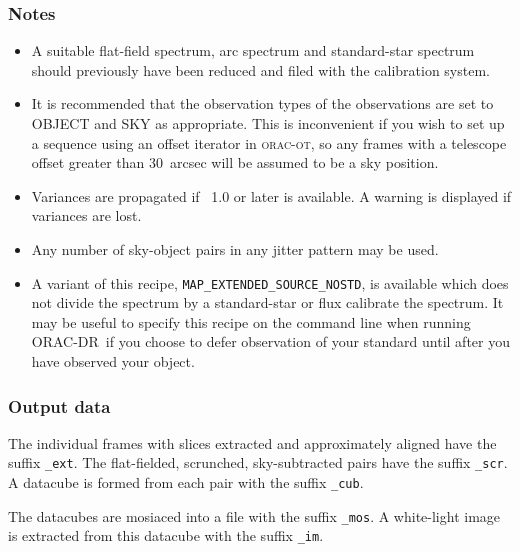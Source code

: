 \documentclass[twoside,11pt,nolof]{starlink}
\providecommand{\KAPPA}{\xref{{\sc{Kappa}}}{sun95}{}}
\providecommand{\ORACDR}{{\footnotesize ORAC-DR}}
\begin{document}
\subsubsection*{Notes}\begin{itemize}
\item

  A suitable flat-field spectrum, arc spectrum and standard-star
  spectrum should previously have been reduced and filed with the
  calibration system.

\item

It is recommended that the observation types of the observations are set
to OBJECT and SKY as appropriate. This is inconvenient if you wish to
set up a sequence using an offset iterator in \textsc{orac-ot}, so any frames
with a telescope offset greater than 30~arcsec will be assumed to be a
sky position.

\item

Variances are propagated if \KAPPA\ 1.0 or later is available. A warning
is displayed if variances are lost.

\item

Any number of sky-object pairs in any jitter pattern may be used.

\item
A variant of this recipe, \texttt{MAP\_EXTENDED\_SOURCE\_NOSTD}, is
available which does not divide the spectrum by a standard-star or
flux calibrate the spectrum. It may be useful to specify this recipe
on the command line when running \ORACDR\ if you choose to defer
observation of your standard until after you have observed your
object.

\end{itemize}

\subsubsection*{Output data}

The individual frames with slices extracted and approximately aligned
have the suffix \texttt{\_ext}. The flat-fielded, scrunched,
sky-subtracted pairs have the suffix \texttt{\_scr}. A datacube is
formed from each pair with the suffix \texttt{\_cub}.

The datacubes are mosiaced into a file with the suffix \texttt{\_mos}. A
white-light image is extracted from this datacube with the suffix \texttt{\_im}.
\end{document}
